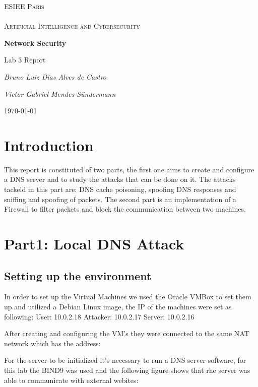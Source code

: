 \documentclass{article}
\begin{document}
\begin{titlepage}
\centering
{\textsc{\Large ESIEE Paris \\ ~\\ Artificial Intelligence and Cybersecurity} \par}
\vfill
{\huge\bfseries Network Security \par}
\vspace{0.5cm}
{\LARGE Lab 3 Report \par}
\vspace{2cm}
{\Large\itshape Bruno Luiz Dias Alves de Castro \par}
{\Large\itshape Victor Gabriel Mendes Sündermann \par}
\vfill

{\large \today\par}
\end{titlepage}

\pagebreak
\tableofcontents
\pagebreak

\section{Introduction}

This report is constituted of two parts, the first one aims to create and configure a DNS server and to study the attacks that can be done on it.
The attacks tackeld in this part are: DNS cache poisoning, spoofing DNS responses and sniffing and spoofing of packets.
The second part is an implementation of a Firewall to filter packets and block the communication between two machines.

\section{Part1: Local DNS Attack}
\subsection{Setting up the environment}
In order to set up the Virtual Machines we used the Oracle VMBox to set them up and utilized a Debian Linux image, the IP of the machines were set as following:
User: 10.0.2.18
Attacker: 10.0.2.17
Server: 10.0.2.16

After creating and configuring the VM's they were connected to the same NAT network which has the address: 

For the server to be initialized it's necessary to run a DNS server software, for this lab the BIND9 was used and the following figure shows that rhe server was able to communicate with external webites:
\end{document}
